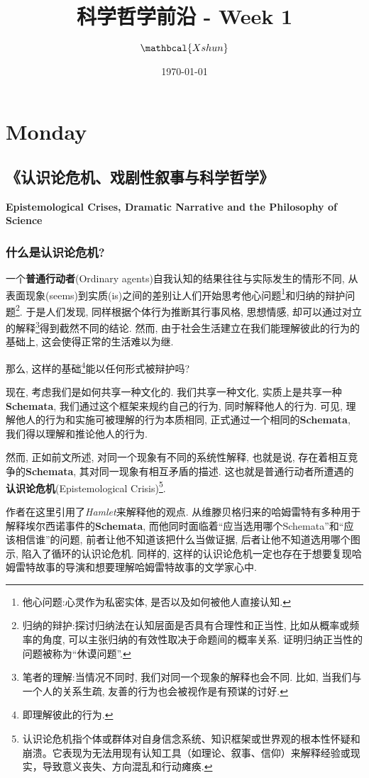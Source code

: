 \documentclass[12pt, a4paper, oneside]{ctexart}
\title{\textbf{科学哲学前沿 - Week 1}}
\author{$\mathbcal{Xshun}$}
\date{\today}
\renewcommand{\b}{\textbf}
\newcommand{\f}{\footnote}
\begin{document}
\maketitle
{
\hypersetup{linkcolor=red}
\tableofcontents
}
\section {Monday}
\subsection{《认识论危机、戏剧性叙事与科学哲学》}
{\centering\textbf{Epistemological Crises, Dramatic Narrative and the Philosophy of Science}}
\subsubsection{什么是认识论危机?}

一个\b{普通行动者}(Ordinary agents)自我认知的结果往往与实际发生的情形不同, 从表面现象(seems)到实质(is)之间的差别让人们开始思考他心问题\f{他心问题:心灵作为私密实体, 是否以及如何被他人直接认知. }和归纳的辩护问题\f{归纳的辩护:探讨归纳法在认知层面是否具有合理性和正当性, 比如从概率或频率的角度, 可以主张归纳的有效性取决于命题间的概率关系. 证明归纳正当性的问题被称为``休谟问题''. }. 于是人们发现, 同样根据个体行为推断其行事风格, 思想情感, 却可以通过对立的解释\f{笔者的理解:当情况不同时, 我们对同一个现象的解释也会不同. 比如, 当我们与一个人的关系生疏, 友善的行为也会被视作是有预谋的讨好. }得到截然不同的结论. 然而, 由于社会生活建立在我们能理解彼此的行为的基础上, 这会使得正常的生活难以为继. 

那么, 这样的基础\f{即理解彼此的行为. }能以任何形式被辩护吗?

现在, 考虑我们是如何共享一种文化的. 我们共享一种文化, 实质上是共享一种\b{Schemata}, 我们通过这个框架来规约自己的行为, 同时解释他人的行为. 可见, 理解他人的行为和实施可被理解的行为本质相同, 正式通过一个相同的\b{Schemata}, 我们得以理解和推论他人的行为.

然而, 正如前文所述, 对同一个现象有不同的系统性解释, 也就是说, 存在着相互竞争的\b{Schemata}, 其对同一现象有相互矛盾的描述. 这也就是普通行动者所遭遇的\b{认识论危机}(Epistemological Crisis)\f{认识论危机指个体或群体对自身信念系统、知识框架或世界观的根本性怀疑和崩溃。它表现为无法用现有认知工具（如理论、叙事、信仰）来解释经验或现实，导致意义丧失、方向混乱和行动瘫痪. }. 

作者在这里引用了\textit{Hamlet}来解释他的观点. 从维滕贝格归来的哈姆雷特有多种用于解释埃尔西诺事件的\b{Schemata}, 而他同时面临着``应当选用哪个Schemata''和``应该相信谁''的问题, 前者让他不知道该把什么当做证据, 后者让他不知道选用哪个图示, 陷入了循环的认识论危机. 同样的, 这样的认识论危机一定也存在于想要复现哈姆雷特故事的导演和想要理解哈姆雷特故事的文学家心中. 
\end{document}
